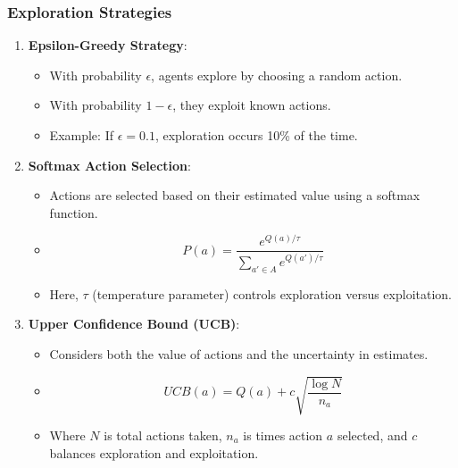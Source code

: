 \documentclass[aspectratio=169]{beamer}
\begin{document}
\begin{frame}[fragile]
    \frametitle{Exploration Strategies}
    \begin{enumerate}
        \item \textbf{Epsilon-Greedy Strategy}:
            \begin{itemize}
                \item With probability $\epsilon$, agents explore by choosing a random action.
                \item With probability $1 - \epsilon$, they exploit known actions.
                \item Example: If $\epsilon = 0.1$, exploration occurs 10\% of the time.
            \end{itemize}

        \item \textbf{Softmax Action Selection}:
            \begin{itemize}
                \item Actions are selected based on their estimated value using a softmax function.
                \item \begin{equation}
                          P(a) = \frac{e^{Q(a)/\tau}}{\sum_{a' \in A} e^{Q(a')/\tau}}
                      \end{equation}
                \item Here, $\tau$ (temperature parameter) controls exploration versus exploitation.
            \end{itemize}

        \item \textbf{Upper Confidence Bound (UCB)}:
            \begin{itemize}
                \item Considers both the value of actions and the uncertainty in estimates.
                \item \begin{equation}
                          UCB(a) = Q(a) + c \sqrt{\frac{\log N}{n_a}}
                      \end{equation}
                \item Where $N$ is total actions taken, $n_a$ is times action $a$ selected, and $c$ balances exploration and exploitation.
            \end{itemize}
    \end{enumerate}
\end{frame}
\end{document}
